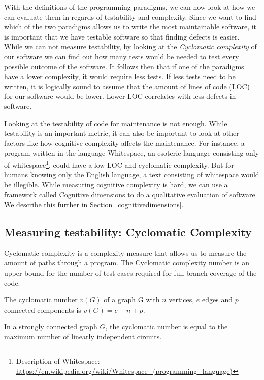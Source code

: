 With the definitions of the programming paradigms, we can now look at how we can
evaluate them in regards of testability and complexity. Since we want to find
which of the two paradigms allows us to write the most maintainable software, it
is important that we have testable software so that finding defects is easier.
While we can not measure testability, by looking at the \textit{Cyclomatic
complexity} of our software we can find out how many tests would be needed to
test every possible outcome of the software. It follows then that if one of the
paradigms have a lower complexity, it would require less tests. If less tests
need to be written, it is logically sound to assume that the amount of lines of
code (LOC) for our software would be lower. Lower LOC correlates with less
defects in software.~\cite{defectloc} 

Looking at the testability of code for maintenance is not enough. While
testability is an important metric, it can also be important to look at other
factors like how cognitive complexity affects the maintenance. For instance, a
program written in the language Whitespace, an esoteric language consisting only
of whitespace\footnote{Description of Whitespace:
\url{https://en.wikipedia.org/wiki/Whitespace_(programming_language)}}, could
have a low LOC and cyclomatic complexity. But for humans knowing only the
English language, a text consisting of whitespace would be illegible. While
measuring cognitive complexity is hard, we can use a framework called Cognitive
dimensions to do a qualitative evaluation of software. We describe this further
in Section~\ref{cognitivedimensions}.


\subsection{Measuring testability: Cyclomatic Complexity}\label{cyclomaticcomplexity}

Cyclomatic complexity is a complexity measure that allows us to measure the
amount of paths through a program. The Cyclomatic complexity number is an upper
bound for the number of test cases required for full branch coverage of the
code. 

\theoremstyle{definition}
\begin{definition}
The cyclomatic number $v(G)$ of a graph G with $n$ vertices, $e$ edges and $p$
connected components is $v(G) = e - n + p$.
\end{definition}

\begin{theorem}
In a strongly connected graph $G$, the cyclomatic number is equal to the
maximum number of linearly independent circuits.~\cite{McCabe}
\end{theorem}

